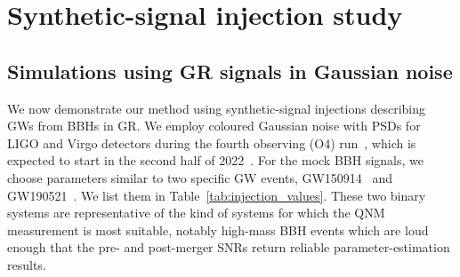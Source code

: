 \documentclass[twocolumn,prd,aps,superscriptaddress,preprintnumbers,tightenlines,showpacs,nofootinbib,eqsecnum,amsfonts,amsmath]{revtex4-1}
\begin{document}


\section{Synthetic-signal injection study}
\label{sec:results}
\subsection{Simulations using GR signals in Gaussian noise} \label{ssec:gr_signal}

We now demonstrate our method using synthetic-signal injections describing GWs
from BBHs in GR. We employ coloured Gaussian noise with PSDs for LIGO and
Virgo detectors during the fourth observing (O4) run~\cite{Abbott:2020qfu}, which 
is expected to start in the second half of 2022~\cite{AdvLIGOPSD,TheVirgo:2014hva}.
For the mock BBH signals, we choose parameters similar to two specific GW events, GW150914~\cite{Abbott:2016blz} and
GW190521~\cite{Abbott:2020tfl}. We list them in Table~\ref{tab:injection_values}.
These two binary systems are representative of the kind of systems for which
the QNM measurement is most suitable, notably high-mass BBH events which are loud enough that the
pre- and post-merger SNRs return reliable parameter-estimation results.
\end{document}

